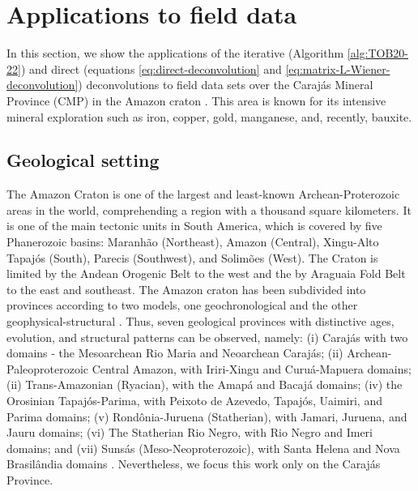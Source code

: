 \section{Applications to field data}
\label{sec:real_data}

In this section, we show the applications of the iterative (Algorithm \ref{alg:TOB20-22}) and direct 
(equations \ref{eq:direct-deconvolution} and \ref{eq:matrix-L-Wiener-deconvolution}) deconvolutions to field data sets 
over the Caraj{\'a}s Mineral Province (CMP) in the Amazon craton \citep{moroni-etal2001,villas-santos2001}. 
This area is known for its intensive mineral exploration such as iron, copper, gold, manganese, and, recently, bauxite.

\subsection{Geological setting}

The Amazon Craton is one of the largest and least-known Archean-Proterozoic areas in the world, comprehending a region with a thousand square kilometers. 
It is one of the main tectonic units in South America, which is covered by five Phanerozoic basins: 
Maranh{\~a}o (Northeast), Amazon (Central), Xingu-Alto Tapaj{\'o}s (South), Parecis (Southwest), and Solim{\~o}es (West). 
The Craton is limited by the Andean Orogenic Belt to the west and the by Araguaia Fold Belt to the east and southeast. 
The Amazon craton has been subdivided into provinces according to two models, one geochronological and the other geophysical-structural 
\citep{amaral1974, teixeira-etal1989, tassinari-macambira1999}. Thus, seven geological provinces with distinctive ages, evolution, and structural 
patterns can be observed, namely: (i) Caraj{\'a}s with two domains - the Mesoarchean Rio Maria and Neoarchean Caraj{\'a}s; 
(ii) Archean-Paleoproterozoic Central Amazon, with Iriri-Xingu and Curuá-Mapuera domains; (ii) Trans-Amazonian (Ryacian), with the Amap{\'a} 
and Bacaj{\'a} domains; (iv) the Orosinian Tapaj{\'o}s-Parima, with Peixoto de Azevedo, Tapaj{\'o}s, Uaimiri, and Parima domains; 
(v) Rond{\^o}nia-Juruena (Statherian), with Jamari, Juruena, and Jauru domains; (vi) The Statherian Rio Negro, with Rio Negro and 
Imeri domains; and (vii) Suns{\'a}s (Meso-Neoproterozoic), with Santa Helena and Nova Brasil{\^a}ndia domains \citep{santos-etal2000}. 
Nevertheless, we focus this work only on the Caraj{\'a}s Province. 

